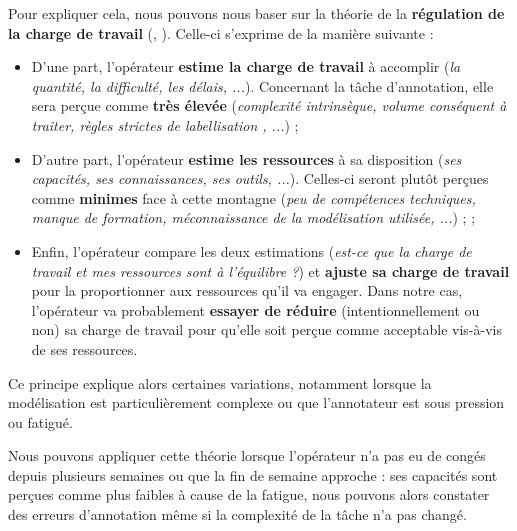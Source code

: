 			Pour expliquer cela, nous pouvons nous baser sur la théorie de la \textbf{régulation de la charge de travail} (\cite{sperandio:1978:regulation-working-methods}, \cite{sperandio:1987:ergonomie-travail-mental}).
			Celle-ci s'exprime de la manière suivante :
			\begin{itemize}
				\item D'une part, l'opérateur \textbf{estime la charge de travail} à accomplir (\textit{la quantité, la difficulté, les délais, ...}).
				Concernant la tâche d'annotation, elle sera perçue comme \textbf{très élevée} (\textit{complexité intrinsèque, volume conséquent à traiter, règles strictes de labellisation , ...}) ;
				\item D'autre part, l'opérateur \textbf{estime les ressources} à sa disposition (\textit{ses capacités, ses connaissances, ses outils, ...}).
				Celles-ci seront plutôt perçues comme \textbf{minimes} face à cette montagne (\textit{peu de compétences techniques, manque de formation, méconnaissance de la modélisation utilisée, ...}) ;
				;
				\item Enfin, l'opérateur compare les deux estimations (\textit{est-ce que la charge de travail et mes ressources sont à l'équilibre ?}) et \textbf{ajuste sa charge de travail} pour la proportionner aux ressources qu'il va engager.
				Dans notre cas, l'opérateur va probablement \textbf{essayer de réduire} (intentionnellement ou non) sa charge de travail pour qu'elle soit perçue comme acceptable vis-à-vis de ses ressources.
			\end{itemize}
			Ce principe explique alors certaines variations, notamment lorsque la modélisation est particulièrement complexe ou que l'annotateur est sous pression ou fatigué.
			\begin{leftBarExamples}
				Nous pouvons appliquer cette théorie lorsque l'opérateur n'a pas eu de congés depuis plusieurs semaines ou que la fin de semaine approche : ses capacités sont perçues comme plus faibles à cause de la fatigue, nous pouvons alors constater des erreurs d'annotation même si la complexité de la tâche n'a pas changé.
			\end{leftBarExamples}
